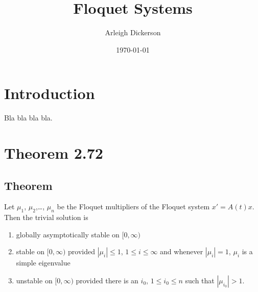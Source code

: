 \documentclass[a4paper]{article}
\title{Floquet Systems}
\author{Arleigh Dickerson}
\date{\today}
\begin{document}
\maketitle

\section{Introduction}

Bla bla bla bla.

\section{Theorem 2.72}

\subsection{Theorem}

Let $\mu_1$, $\mu_2$,\ldots, $\mu_n$ be the Floquet multipliers of the Floquet system $x' = A(t)x$. Then the trivial solution is \begin{enumerate}
    \item globally asymptotically stable on $[0,\infty)$
    \item stable on $[0,\infty)$ provided $|\mu_i| \leq 1$, $1 \leq i \leq \infty$ and whenever $|\mu_i| = 1$, $\mu_i$ is a simple eigenvalue
    \item unstable on $[0,\infty)$ provided there is an $i_0$, $1 \leq i_0 \leq n$ such that $|\mu_{i_0}| > 1$.
\end{enumerate}
\end{document}
